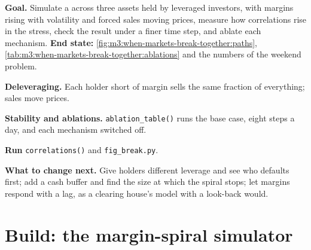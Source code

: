 \begin{tutorial}
\textbf{Goal.} Simulate a  across three assets held by leveraged investors, with margins rising with volatility and forced sales moving prices,
measure how correlations rise in the stress, check the result under a finer time step, and ablate each mechanism. \textbf{End state:}
\cref{fig:m3:when-markets-break-together:paths}, \cref{tab:m3:when-markets-break-together:ablations} and the numbers of the weekend problem.
\begin{tutsteps}
\item \textbf{Deleveraging.} Each holder short of margin sells the same fraction of everything; sales move prices.
\label{lst:m3:when-markets-break-together:delever}
\item \textbf{Stability and ablations.} \texttt{ablation\_table()} runs the base case, eight steps a day, and each mechanism switched off.
\item \textbf{Run} \texttt{correlations()} and \texttt{fig\_break.py}.
\end{tutsteps}
\textbf{What to change next.} Give holders different leverage and see who defaults first; add a cash buffer and find the size at which the spiral stops;
let margins respond with a lag, as a clearing house's model with a look-back would.
\end{tutorial}

\section{Build: the margin-spiral simulator}\label{bld:m3:when-markets-break-together:marginspiral}

